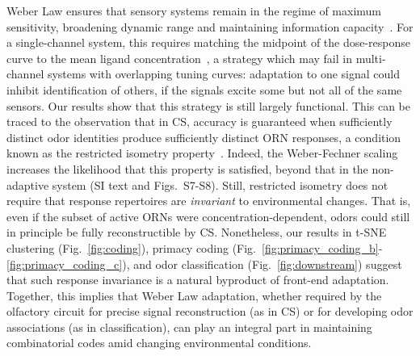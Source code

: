 \documentclass[10pt,prl,aps,showpacs,twocolumn,unsortedaddress]{revtex4-1}
\begin{document}
Weber Law ensures that sensory systems remain in the regime of maximum sensitivity, broadening dynamic range and maintaining information capacity~\cite{adaptation_fairhall}.
For a single-channel system, this requires matching the midpoint of the dose-response curve to the mean ligand concentration~\cite{information_theory_adaptation}, a strategy which may fail in multi-channel systems with overlapping tuning curves: adaptation to one signal could inhibit identification of others, if the signals excite some but not all of the same sensors. 
Our results show that this strategy is still largely functional. This can be traced to the observation that in CS, accuracy is guaranteed when sufficiently distinct odor identities produce sufficiently distinct ORN responses, a condition known as the restricted isometry property~\cite{CS_tao}. Indeed, the Weber-Fechner scaling increases the likelihood that this property  is satisfied, beyond that in the non-adaptive system (SI text and Figs.~S7-S8). Still, restricted isometry does not require that response repertoires are \textit{invariant} to environmental changes. That is, even if the subset of active ORNs were concentration-dependent, odors could still in principle be fully reconstructible by CS.
Nonetheless, our results in t-SNE clustering (Fig.~\ref{fig:coding}), primacy coding  (Fig.~\ref{fig:primacy_coding_b}-\ref{fig:primacy_coding_c}), and odor classification (Fig.~\ref{fig:downstream}) suggest that such response invariance is a natural byproduct of front-end adaptation. Together, this implies that Weber Law adaptation, whether required by the olfactory circuit for precise signal reconstruction (as in CS) or for developing odor associations (as in classification), can play an integral part in maintaining combinatorial codes amid changing environmental conditions.


\end{document}
